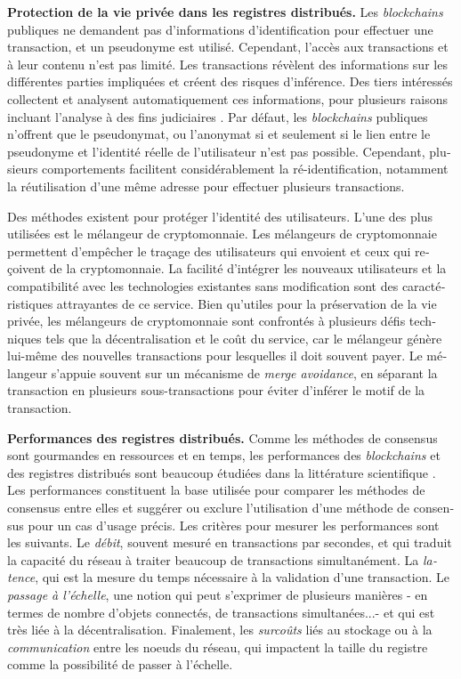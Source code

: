 \begin{otherlanguage}{french}
\textbf{Protection de la vie privée dans les registres distribués.}
 Les \emph{blockchains} publiques ne demandent pas d'informations d'identification pour effectuer une transaction, et un pseudonyme est utilisé. Cependant, l'accès aux transactions et à leur contenu n'est pas limité. Les transactions
révèlent des informations sur les différentes parties impliquées et créent des risques d'inférence.
Des tiers intéressés collectent et analysent automatiquement ces informations, pour plusieurs raisons incluant l'analyse à des fins judiciaires \cite{Harrigan2016}. Par défaut, les \emph{blockchains} publiques n'offrent que le pseudonymat, ou l'anonymat si et seulement si le lien entre le pseudonyme et l'identité réelle de l'utilisateur n'est pas possible. Cependant, plusieurs comportements
facilitent considérablement la ré-identification, notamment la réutilisation d'une même adresse pour effectuer plusieurs transactions.

Des méthodes existent pour protéger l'identité des utilisateurs. L'une des plus utilisées est le mélangeur de cryptomonnaie. Les mélangeurs de cryptomonnaie permettent d'empêcher le traçage des utilisateurs qui envoient et ceux qui reçoivent de la cryptomonnaie.
La facilité d'intégrer les nouveaux
utilisateurs et la compatibilité avec les technologies existantes sans modification sont des caractéristiques attrayantes de ce service. Bien qu'utiles pour la préservation de la vie privée, les mélangeurs de cryptomonnaie sont confrontés à plusieurs défis techniques tels que
la décentralisation et le coût du service, car le mélangeur génère lui-même des nouvelles transactions pour lesquelles il doit souvent payer. Le mélangeur s'appuie souvent sur un mécanisme de \emph{merge avoidance}, en séparant la transaction en plusieurs sous-transactions pour éviter d'inférer le motif de la transaction.

\textbf{Performances des registres distribués.}
Comme les méthodes de consensus sont gourmandes en ressources et en temps, les performances des \emph{blockchains} et des registres distribués sont beaucoup étudiées dans la littérature scientifique \cite{Brotsis2021, Fan2021, Chen2022, Okegbile2022}. 
Les performances constituent la base utilisée pour comparer les méthodes de consensus entre elles et suggérer ou exclure l'utilisation d'une méthode de consensus pour un cas d'usage précis. Les critères pour mesurer les performances sont les suivants. Le \emph{débit}, souvent mesuré en transactions par secondes, et qui traduit la capacité du réseau à traiter beaucoup de transactions simultanément. La \emph{latence}, qui est la mesure du temps nécessaire à la validation d'une transaction. Le \emph{passage à l'échelle}, une notion qui peut s'exprimer de plusieurs manières - en termes de nombre d'objets connectés, de transactions simultanées...- et qui est très liée à la décentralisation. Finalement, les \emph{surcoûts} liés au stockage ou à la \emph{communication} entre les noeuds du réseau, qui impactent la taille du registre comme la possibilité de passer à l'échelle. 


\end{otherlanguage}
